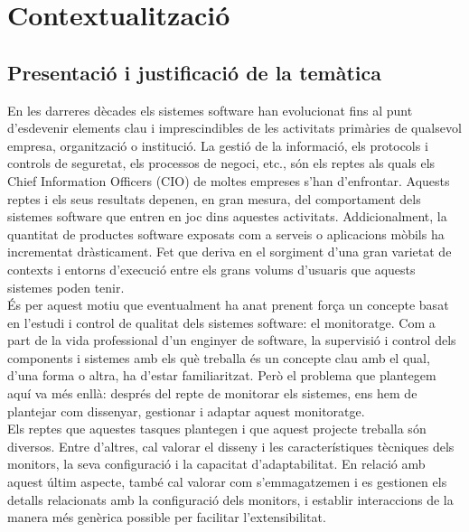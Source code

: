 \chapter{Contextualització}

\label{Contextualitzacio}

\section{Presentació i justificació de la temàtica}

En les darreres dècades els sistemes software han evolucionat fins al punt d’esdevenir elements clau i imprescindibles de les activitats primàries de qualsevol empresa, organització o institució. La gestió de la informació, els protocols i controls de seguretat, els processos de negoci, etc., són els reptes als quals els Chief Information Officers (CIO) de moltes empreses s’han d’enfrontar. Aquests reptes i els seus resultats depenen, en gran mesura, del comportament dels sistemes software que entren en joc dins aquestes activitats. Addicionalment, la quantitat de productes software exposats com a serveis o aplicacions mòbils ha incrementat dràsticament. Fet que deriva en el sorgiment d'una gran varietat de contexts i entorns d'execució entre els grans volums d'usuaris que aquests sistemes poden tenir. \\

És per aquest motiu que eventualment ha anat prenent força un concepte basat en l’estudi i control de qualitat dels sistemes software: el monitoratge. Com a part de la vida professional d’un enginyer de software, la supervisió i control dels components i sistemes amb els què treballa és un concepte clau amb el qual, d’una forma o altra, ha d’estar familiaritzat. Però el problema que plantegem aquí va més enllà: després del repte de monitorar els sistemes, ens hem de plantejar com dissenyar, gestionar i adaptar aquest monitoratge.\\

Els reptes que aquestes tasques plantegen i que aquest projecte treballa són diversos. Entre d'altres, cal valorar el disseny i les característiques tècniques dels monitors, la seva configuració i la capacitat d'adaptabilitat. En relació amb aquest últim aspecte, també cal valorar com s'emmagatzemen i es gestionen els detalls relacionats amb la configuració dels monitors, i establir interaccions de la manera més genèrica possible per facilitar l'extensibilitat.\\

